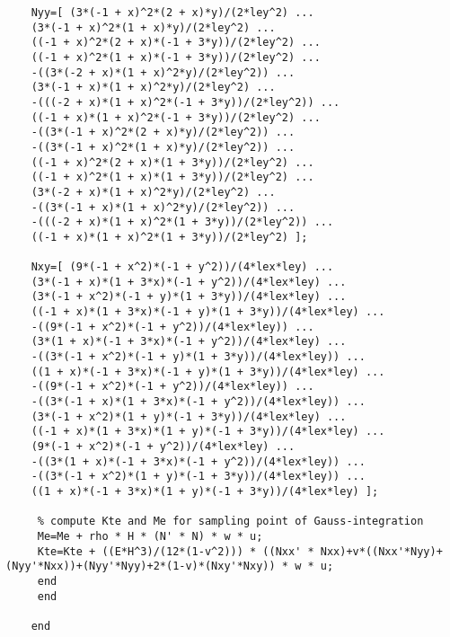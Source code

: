 \begin{lstlisting}
	Nyy=[ (3*(-1 + x)^2*(2 + x)*y)/(2*ley^2) ...
	(3*(-1 + x)^2*(1 + x)*y)/(2*ley^2) ...
	((-1 + x)^2*(2 + x)*(-1 + 3*y))/(2*ley^2) ...
	((-1 + x)^2*(1 + x)*(-1 + 3*y))/(2*ley^2) ...
	-((3*(-2 + x)*(1 + x)^2*y)/(2*ley^2)) ...
	(3*(-1 + x)*(1 + x)^2*y)/(2*ley^2) ...
	-(((-2 + x)*(1 + x)^2*(-1 + 3*y))/(2*ley^2)) ...
	((-1 + x)*(1 + x)^2*(-1 + 3*y))/(2*ley^2) ...
	-((3*(-1 + x)^2*(2 + x)*y)/(2*ley^2)) ...
	-((3*(-1 + x)^2*(1 + x)*y)/(2*ley^2)) ...
	((-1 + x)^2*(2 + x)*(1 + 3*y))/(2*ley^2) ...
	((-1 + x)^2*(1 + x)*(1 + 3*y))/(2*ley^2) ...
	(3*(-2 + x)*(1 + x)^2*y)/(2*ley^2) ...
	-((3*(-1 + x)*(1 + x)^2*y)/(2*ley^2)) ...
	-(((-2 + x)*(1 + x)^2*(1 + 3*y))/(2*ley^2)) ...
	((-1 + x)*(1 + x)^2*(1 + 3*y))/(2*ley^2) ];
	
	Nxy=[ (9*(-1 + x^2)*(-1 + y^2))/(4*lex*ley) ...
	(3*(-1 + x)*(1 + 3*x)*(-1 + y^2))/(4*lex*ley) ...
	(3*(-1 + x^2)*(-1 + y)*(1 + 3*y))/(4*lex*ley) ...
	((-1 + x)*(1 + 3*x)*(-1 + y)*(1 + 3*y))/(4*lex*ley) ...
	-((9*(-1 + x^2)*(-1 + y^2))/(4*lex*ley)) ...
	(3*(1 + x)*(-1 + 3*x)*(-1 + y^2))/(4*lex*ley) ...
	-((3*(-1 + x^2)*(-1 + y)*(1 + 3*y))/(4*lex*ley)) ...
	((1 + x)*(-1 + 3*x)*(-1 + y)*(1 + 3*y))/(4*lex*ley) ...
	-((9*(-1 + x^2)*(-1 + y^2))/(4*lex*ley)) ...
	-((3*(-1 + x)*(1 + 3*x)*(-1 + y^2))/(4*lex*ley)) ...
	(3*(-1 + x^2)*(1 + y)*(-1 + 3*y))/(4*lex*ley) ...
	((-1 + x)*(1 + 3*x)*(1 + y)*(-1 + 3*y))/(4*lex*ley) ...
	(9*(-1 + x^2)*(-1 + y^2))/(4*lex*ley) ...
	-((3*(1 + x)*(-1 + 3*x)*(-1 + y^2))/(4*lex*ley)) ...
	-((3*(-1 + x^2)*(1 + y)*(-1 + 3*y))/(4*lex*ley)) ...
	((1 + x)*(-1 + 3*x)*(1 + y)*(-1 + 3*y))/(4*lex*ley) ];
	
	 % compute Kte and Me for sampling point of Gauss-integration
	 Me=Me + rho * H * (N' * N) * w * u;
	 Kte=Kte + ((E*H^3)/(12*(1-v^2))) * ((Nxx' * Nxx)+v*((Nxx'*Nyy)+(Nyy'*Nxx))+(Nyy'*Nyy)+2*(1-v)*(Nxy'*Nxy)) * w * u;
	 end
	 end
	
	end
	\end{lstlisting}